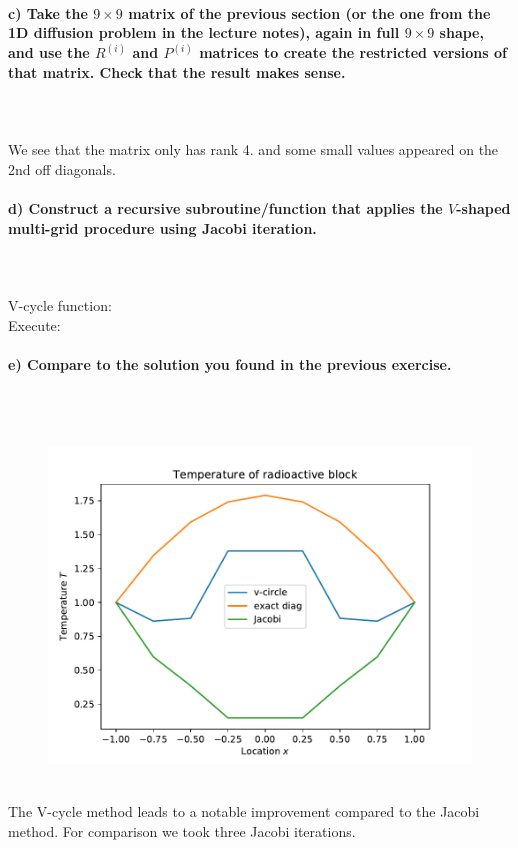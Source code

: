 \paragraph{
    c) Take the $9\times9$ matrix of the previous section (or the one
    from the 1D diffusion problem in the lecture notes), again in full
    $9\times9$ shape, and use the $R^{(i)}$ and $P^{(i)}$ matrices to
    create the restricted versions of that matrix.
    Check that the result makes sense.
} \ \\
    \\
    

We see that the matrix only has rank 4. and some small values appeared on the 2nd off diagonals.

\newpage
\paragraph{
    d) Construct a recursive subroutine/function that applies the
    $V$-shaped multi-grid procedure using Jacobi iteration.
} \ \\
    \\
    V-cycle function:
     \ \\
    Execute:
    

\newpage
\paragraph{
    e) Compare to the solution you found in the previous exercise.
} \ \\
    \\
    \begin{figure}[h!]
        \centering
        \includegraphics[width=.7\textwidth]{../figures/Aufg2e.pdf}
    \end{figure} \ \\
    The V-cycle method leads to a notable improvement compared to the
    Jacobi method. For comparison we took three Jacobi iterations.
